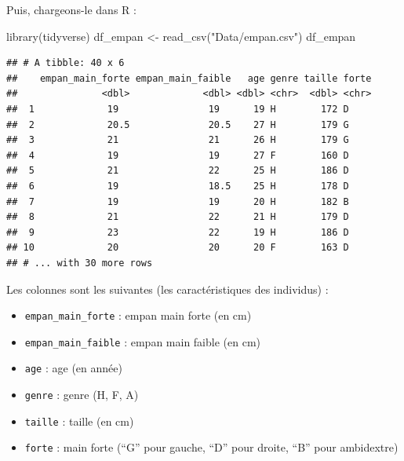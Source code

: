 \documentclass[
  11pt,
]{book}
\newcommand{\VERB}{\Verb[commandchars=\\\{\}]}
\newenvironment{Shaded}{\begin{snugshade}}{\end{snugshade}}
\newcommand{\FunctionTok}[1]{\textcolor[rgb]{0.00,0.00,0.00}{#1}}
\newcommand{\NormalTok}[1]{#1}
\newcommand{\OtherTok}[1]{\textcolor[rgb]{0.56,0.35,0.01}{#1}}
\newcommand{\StringTok}[1]{\textcolor[rgb]{0.31,0.60,0.02}{#1}}
\providecommand{\tightlist}{%
  \setlength{\itemsep}{0pt}\setlength{\parskip}{0pt}}
\numberwithin{equation}{section}
\numberwithin{countremarque}{section}
\newenvironment{greenbox}{
  \begin{tcolorbox}[breakable, colback=vert,coltext=black,
                  colframe=grisfonce]}
 {\end{tcolorbox}}
\begin{document}
Puis, chargeons-le dans R :

\begin{Shaded}
\begin{Highlighting}[]
\FunctionTok{library}\NormalTok{(tidyverse)}
\NormalTok{df\_empan }\OtherTok{\textless{}{-}} \FunctionTok{read\_csv}\NormalTok{(}\StringTok{"Data/empan.csv"}\NormalTok{)}
\NormalTok{df\_empan}
\end{Highlighting}
\end{Shaded}

\begin{lstlisting}
## # A tibble: 40 x 6
##    empan_main_forte empan_main_faible   age genre taille forte
##               <dbl>             <dbl> <dbl> <chr>  <dbl> <chr>
##  1             19                19      19 H        172 D    
##  2             20.5              20.5    27 H        179 G    
##  3             21                21      26 H        179 G    
##  4             19                19      27 F        160 D    
##  5             21                22      25 H        186 D    
##  6             19                18.5    25 H        178 D    
##  7             19                19      20 H        182 B    
##  8             21                22      21 H        179 D    
##  9             23                22      19 H        186 D    
## 10             20                20      20 F        163 D    
## # ... with 30 more rows
\end{lstlisting}

Les colonnes sont les suivantes (les caractéristiques des individus) :

\begin{itemize}
\tightlist
\item
  \texttt{empan\_main\_forte} : empan main forte (en cm)
\item
  \texttt{empan\_main\_faible} : empan main faible (en cm)
\item
  \texttt{age} : age (en année)
\item
  \texttt{genre} : genre (H, F, A)
\item
  \texttt{taille} : taille (en cm)
\item
  \texttt{forte} : main forte (``G'' pour gauche, ``D'' pour droite, ``B'' pour ambidextre)
\end{itemize}

\begin{greenbox}


\end{greenbox}
\end{document}
